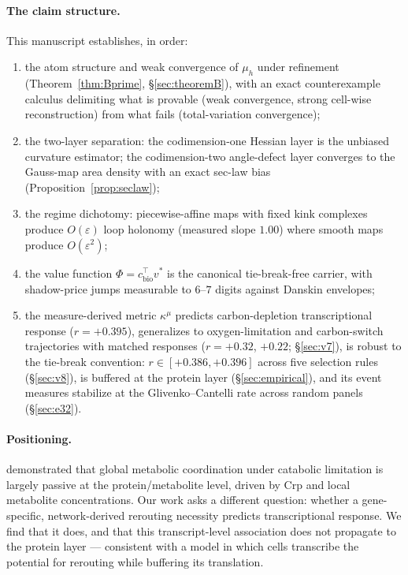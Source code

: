 \documentclass[11pt,a4paper]{article}
\theoremstyle{plain}
\theoremstyle{definition}
\theoremstyle{remark}
\newcommand{\kmu}{\kappa^{\mu}}
\begin{document}
\paragraph{The claim structure.}
This manuscript establishes, in order:
\begin{enumerate}[label=(\roman*)]
\item the atom structure and weak convergence of $\mu_h$
      under refinement (Theorem~\ref{thm:Bprime}, \S\ref{sec:theoremB}), with an exact counterexample calculus delimiting what is provable (weak convergence, strong cell-wise reconstruction) from what fails (total-variation convergence);
\item the two-layer separation: the codimension-one Hessian
      layer is the unbiased curvature estimator; the codimension-two
      angle-defect layer converges to the Gauss-map area density with an
      exact sec-law bias (Proposition~\ref{prop:seclaw});
\item the regime dichotomy: piecewise-affine maps with fixed
      kink complexes produce $O(\varepsilon)$ loop holonomy (measured slope
      $1.00$) where smooth maps produce $O(\varepsilon^2)$;
\item the value function $\Phi = c_{\mathrm{bio}}^\top v^*$
      is the canonical tie-break-free carrier, with shadow-price jumps
      measurable to $6$--$7$ digits against Danskin envelopes;
\item the measure-derived metric $\kmu$ predicts
      carbon-depletion transcriptional response ($r = +0.395$),
      generalizes to oxygen-limitation and carbon-switch trajectories
      with matched responses ($r = +0.32$, $+0.22$; \S\ref{sec:v7}), is
      robust to the tie-break convention: $r \in [+0.386, +0.396]$
      across five selection rules (\S\ref{sec:v8}), is buffered at the
      protein layer
      (\S\ref{sec:empirical}), and its event measures stabilize at
      the Glivenko--Cantelli rate across random panels (\S\ref{sec:e32}).
\end{enumerate}

\paragraph{Positioning.}
\citet{kochanowski2013} demonstrated that global metabolic coordination under
catabolic limitation is largely passive at the protein/metabolite level,
driven by Crp and local metabolite concentrations. Our work asks a
different question: whether a gene-specific, network-derived rerouting
necessity predicts transcriptional response. We find that it does, and that
this transcript-level association does not propagate to the protein layer
--- consistent with a model in which cells transcribe the potential for
rerouting while buffering its translation.
\end{document}
